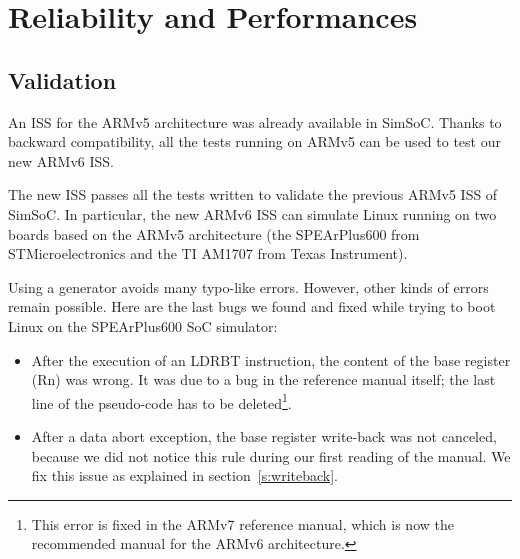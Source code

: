 \documentclass[conference]{ieeeconf}
\begin{document}


\section{Reliability and Performances}
\label{s:result}

\subsection{Validation}

An ISS for the ARMv5 architecture was already available in SimSoC. Thanks to
backward compatibility, all the tests running on ARMv5 can be used to test our
new ARMv6 ISS.

The new ISS passes all the tests written to validate the previous ARMv5 ISS of
SimSoC. In particular, the new ARMv6 ISS can simulate Linux running on two
boards based on the ARMv5 architecture (the SPEArPlus600 from STMicroelectronics
and the TI AM1707 from Texas Instrument).

Using a generator avoids many typo-like errors. However, other kinds of errors
remain possible. Here are the last bugs we found and fixed while trying to boot
Linux on the SPEArPlus600 SoC simulator:
\begin{itemize}
\item After the execution of an {\stt LDRBT instruction}, the content of the
  base register ({\stt Rn}) was wrong. It was due to a bug in the reference
  manual itself; the last line of the pseudo-code has to be
  deleted\footnote{This error is fixed in the ARMv7 reference manual, which is
    now the recommended manual for the ARMv6 architecture.}.
\item After a data abort exception, the base register write-back was not
  canceled, because we did not notice this rule during our first reading of the
  manual. We fix this issue as explained in section~\ref{s:writeback}.
\end{itemize}
\end{document}
